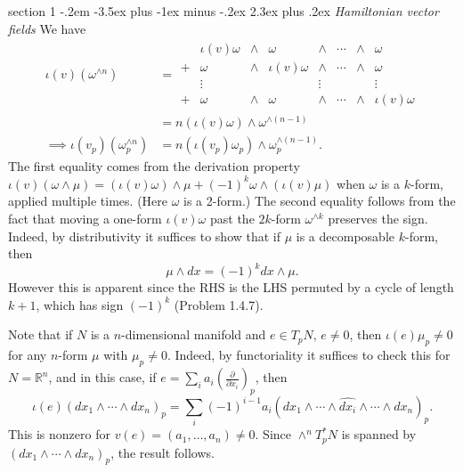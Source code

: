 \documentclass[12pt]{article}
\makeatletter
\theoremstyle{norm}
\newcommand{\R}[0]{\mathbb{R}}
\newcommand{\ga}[0]{\gamma}
\newcommand{\om}[0]{\omega}
\newcommand{\Om}[0]{\Omega}
\newcommand{\pa}[1]{\left( {#1} \right)}
\newcommand{\pd}[2]{\frac{\partial #1}{\partial #2}}
\newenvironment{problem}{\@startsection
       {section}
       {1}
       {-.2em}
       {-3.5ex plus -1ex minus -.2ex}
       {2.3ex plus .2ex}
       {\pagebreak[3]%
       \large\bf\noindent{Problem }
       }
       }
       {%
       }
\makeatother
\begin{document}
\begin{problem}{\it Hamiltonian vector fields}
We have
\begin{align*}
\iota(v)(\om^{\wedge n})&=\begin{array}{cccccccc}
 &\iota(v)\omega & \wedge & \omega & \wedge & \cdots & \wedge & \omega\\
+ & \omega & \wedge & \iota(v)\omega& \wedge & \cdots & \wedge & \omega\\
 & \vdots &  &  & \vdots &  &  & \vdots\\
+ & \omega & \wedge & \omega & \wedge & \cdots & \wedge & \iota(v)\omega\end{array}\\
&=n(\iota(v)\om)\wedge \om^{\wedge (n-1)}\\
\implies \iota(v_p)(\om_p^{\wedge n})&=n(\iota(v_p)\omega_p)\wedge \om_p^{\wedge(n-1)}.
\end{align*}
The first equality comes from the derivation property $\iota(v)(\om\wedge \mu)=(\iota(v)\om)\wedge\mu+(-1)^k\om\wedge(\iota(v)\mu)$ when $\om$ is a $k$-form, applied multiple times. (Here $\om$ is a 2-form.) The second equality follows from the fact that moving a one-form $\iota(v)\om$ past the $2k$-form $\om^{\wedge k}$ preserves the sign. Indeed, by distributivity it suffices to show  that if $\mu$ is a decomposable $k$-form, then
\[
\mu\wedge dx=(-1)^k dx\wedge\mu.
\]
However this is apparent since the RHS is the LHS permuted by a cycle of length $k+1$, which has sign $(-1)^k$ (Problem 1.4.7).


Note that if $N$ is a $n$-dimensional manifold and $e\in T_pN,\,e\neq 0$, then $\iota(e)\mu_p\ne 0$ for any $n$-form $\mu$ with $\mu_p\ne 0$. Indeed, by functoriality it suffices to check this for $N=\R^n$, and in this case, if $e=\sum_i a_i\pa{\pd{}{x_i}}_p$, then
\[
\iota(e)(dx_1\wedge \cdots \wedge dx_n)_p=\sum_i (-1)^{i-1} a_i(dx_1\wedge \cdots \wedge \widehat{dx_i}\wedge \cdots \wedge dx_n)_p.
\]
This is nonzero for $v(e)=(a_1,\ldots, a_n)\neq 0$. Since $\wedge^nT_p^*N$ is spanned by $(dx_1\wedge \cdots \wedge dx_n)_p$, the result follows.


\end{problem}
\end{document}
